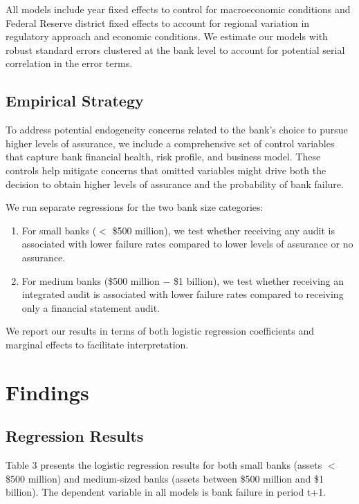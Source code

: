 \documentclass[12pt]{article}
\begin{document}
All models include year fixed effects to control for macroeconomic conditions and Federal Reserve district fixed effects to account for regional variation in regulatory approach and economic conditions. We estimate our models with robust standard errors clustered at the bank level to account for potential serial correlation in the error terms.

\subsection{Empirical Strategy}

To address potential endogeneity concerns related to the bank's choice to pursue higher levels of assurance, we include a comprehensive set of control variables that capture bank financial health, risk profile, and business model. These controls help mitigate concerns that omitted variables might drive both the decision to obtain higher levels of assurance and the probability of bank failure.

We run separate regressions for the two bank size categories:

\begin{enumerate}
    \item For small banks ($<$ \$500 million), we test whether receiving any audit is associated with lower failure rates compared to lower levels of assurance or no assurance.
    
    \item For medium banks (\$500 million $-$ \$1 billion), we test whether receiving an integrated audit is associated with lower failure rates compared to receiving only a financial statement audit.
\end{enumerate}

We report our results in terms of both logistic regression coefficients and marginal effects to facilitate interpretation.

\section{Findings}

\subsection{Regression Results}

Table 3 presents the logistic regression results for both small banks (assets $<$ \$500 million) and medium-sized banks (assets between \$500 million and \$1 billion). The dependent variable in all models is bank failure in period t+1.
\end{document}
